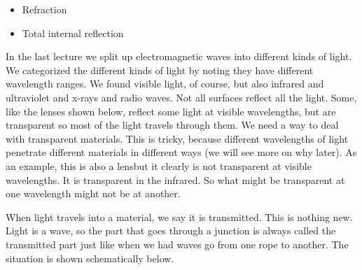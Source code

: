 \documentclass{article}
\begin{document}
\vspace{0.10in}%

\begin{itemize}
\item Refraction

\item Total internal reflection
\end{itemize}

In the last lecture we split up electromagnetic waves into different kinds
of light. We categorized the different kinds of light by noting they have
different wavelength ranges. We found visible light, of course, but also
infrared and ultraviolet and x-rays and radio waves. Not all surfaces
reflect all the light. Some, like the lenses shown below, reflect some light
at visible wavelengths, but are transparent so most of the light travels
through them. We need a way to deal with
transparent materials. This is tricky, because different wavelengths of
light penetrate different materials in different ways (we will see more on
why later). As an example, this is also a lensbut it clearly is not transparent
at visible wavelengths. It is transparent in the infrared. So what might be
transparent at one wavelength might not be at another.

When light travels into a material, we say it is transmitted. This is
nothing new. Light is a wave, so the part that goes through a junction is
always called the transmitted part just like when we had waves go from one
rope to another. The situation is shown schematically below.
\end{document}

